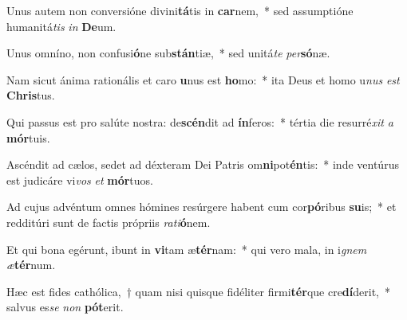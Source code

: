 \item Unus autem non conversióne divini\textbf{tá}tis in \textbf{car}nem,~* sed assumptióne humanitá\textit{tis} \textit{in} \textbf{De}um.
\item Unus omníno, non confusi\textbf{ó}ne sub\textbf{stán}tiæ,~* sed unitá\textit{te} \textit{per}\textbf{só}næ.
\item Nam sicut ánima rationális et caro \textbf{u}nus est \textbf{ho}mo:~* ita Deus et homo u\textit{nus} \textit{est} \textbf{Chris}tus.
\item Qui passus est pro salúte nostra: de\textbf{scén}dit ad \textbf{ín}feros:~* tértia die resurré\textit{xit} \textit{a} \textbf{mór}tuis.
\item Ascéndit ad cælos, sedet ad déxteram Dei Patris om\textbf{ni}pot\textbf{én}tis:~* inde ventúrus est judicáre vi\textit{vos} \textit{et} \textbf{mór}tuos.
\item Ad cujus advéntum omnes hómines resúrgere habent cum cor\textbf{pó}ribus \textbf{su}is;~* et redditúri sunt de factis própriis \textit{ra}\textit{ti}\textbf{ó}nem.
\item Et qui bona egérunt, ibunt in \textbf{vi}tam æ\textbf{tér}nam:~* qui vero mala, in i\textit{gnem} \textit{æ}\textbf{tér}num.
\item Hæc est fides cathólica,~† quam nisi quisque fidéliter firmi\textbf{tér}que cre\textbf{dí}derit,~* salvus es\textit{se} \textit{non} \textbf{pót}erit.
